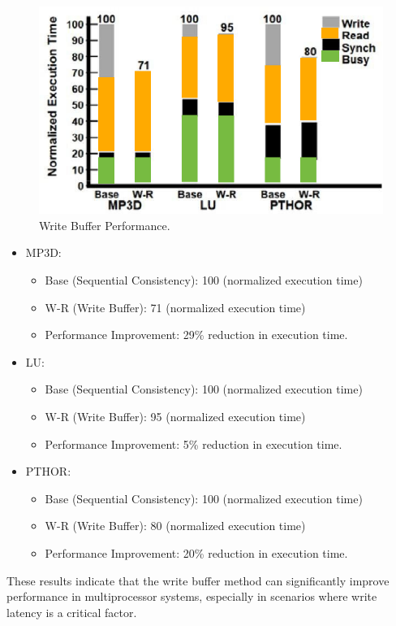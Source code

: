 \begin{figure}[!htp]
    \centering
    \includegraphics[width=.6\textwidth]{img/write-buffer-performance-1.pdf}
    \caption{Write Buffer Performance.}
    \label{fig: Write Buffer Performance}
\end{figure}

\begin{itemize}
    \item MP3D:
    \begin{itemize}
        \item Base (Sequential Consistency): 100 (normalized execution time)
        \item W-R (Write Buffer): 71 (normalized execution time)
        \item Performance Improvement: 29\% reduction in execution time.
    \end{itemize}

    \item LU:
    \begin{itemize}
        \item Base (Sequential Consistency): 100 (normalized execution time)
        \item W-R (Write Buffer): 95 (normalized execution time)
        \item Performance Improvement: 5\% reduction in execution time.
    \end{itemize}
    
    \item PTHOR:
    \begin{itemize}
        \item Base (Sequential Consistency): 100 (normalized execution time)
        \item W-R (Write Buffer): 80 (normalized execution time)
        \item Performance Improvement: 20\% reduction in execution time.
    \end{itemize}
\end{itemize}
These results indicate that the write buffer method can significantly improve performance in multiprocessor systems, especially in scenarios where write latency is a critical factor.

